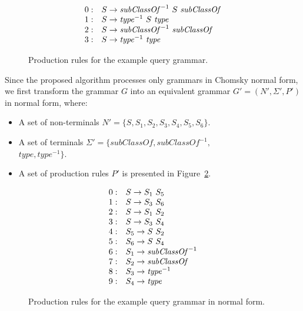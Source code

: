 \begin{figure}[h]
   \[
\begin{array}{rl}
   0: & S \rightarrow \text{\textit{subClassOf}}^{-1} \ S \ \text{\textit{subClassOf}} \\ 
   1: & S \rightarrow \text{\textit{type}}^{-1} \ S \ \text{\textit{type}} \\ 
   2: & S \rightarrow \text{\textit{subClassOf}}^{-1} \ \text{\textit{subClassOf}} \\ 
   3: & S \rightarrow \text{\textit{type}}^{-1} \ \text{\textit{type}} \\ 
\end{array}
\]
\caption{Production rules for the example query grammar.}
\label{ProductionRulesExampleQuery}
\end{figure}

Since the proposed algorithm processes only grammars in Chomsky normal form, we first transform the grammar $G$ into an equivalent grammar $G' = (N', \Sigma', P')$ in normal form, where:
\begin{itemize}
    \item A set of non-terminals $N' = \{S, S_1, S_2, S_3, S_4, S_5, S_6\}$.
    \item A set of terminals $\Sigma' = \{subClassOf, subClassOf^{-1},$ \\ $type, type^{-1}\}$.
    \item A set of production rules $P'$ is presented in Figure~\ref{ProductionRulesExampleQueryCNF}.
\end{itemize}

\begin{figure}[h]
   \[
\begin{array}{rl}
   0: & S \rightarrow S_1 \ S_5 \\
   1: & S \rightarrow S_3 \ S_6 \\
   2: & S \rightarrow S_1 \ S_2 \\
   3: & S \rightarrow S_3 \ S_4 \\
   4: & S_5 \rightarrow S \ S_2 \\
   5: & S_6 \rightarrow S \ S_4 \\
   6: & S_1 \rightarrow \text{\textit{subClassOf}}^{-1} \\ 
   7: & S_2 \rightarrow \text{\textit{subClassOf}} \\ 
   8: & S_3 \rightarrow \text{\textit{type}}^{-1} \\
   9: & S_4 \rightarrow \text{\textit{type}} \\ 
\end{array}
\]
\caption{Production rules for the example query grammar in normal form.}
\label{ProductionRulesExampleQueryCNF}
\end{figure}

